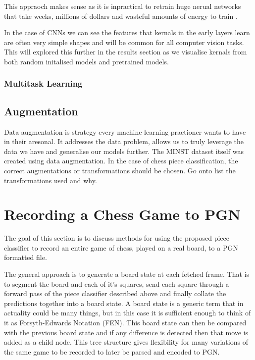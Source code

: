 This appraoch makes sense as it is inpractical to retrain huge nerual networks that take weeks, millions of dollars and wasteful amounts of energy
to train \cite{}.

In the case of CNNs we can see the features that kernals in the early layers learn \cite{} are often very simple shapes and will be common for all
computer vision tasks.  This will explored this further in the results section as we visualise kernals from both random initalised models and 
pretrained models.

\subsubsection{Multitask Learning}

\subsection{Augmentation}
Data augmentation is strategy every machine learning practioner wants to have in their aresonal.  It addresses the data problem, allows us to truly 
leverage the data we have and generalise our models further.  The MINST \cite{} dataset itself was created using data augmentation.
In the case of chess piece classification, the correct augmentations or transformations should be chosen.
Go onto list the transformations used and why.


\section{Recording a Chess Game to PGN}
The goal of this section is to discuss methods for using the proposed piece classifier to record an entire game of chess, played on a real board, 
to a PGN formatted file.

The general approach is to generate a board state at each fetched frame.  That is to segment the board and each of it's squares, send each square 
through a forward pass of the piece classifier described above and finally collate the predictions together into a board state.  A board state is 
a generic term that in actuality could be many things, but in this case it is sufficient enough to think of it as Forsyth-Edwards Notation (FEN).
This board state can then be compared with the previous board state and if any difference is detected then that move is added as a child node.
This tree structure gives flexibility for many variations of the same game to be recorded to later be parsed and encoded to PGN.


